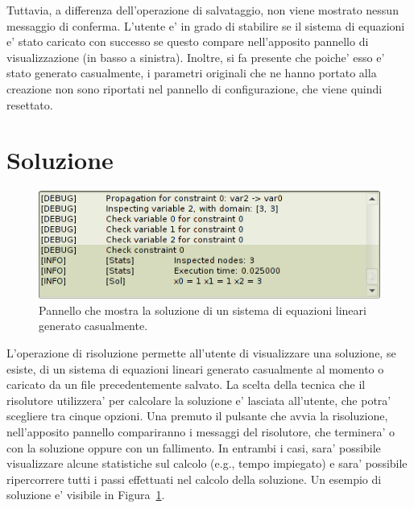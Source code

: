 \documentclass{article}
\begin{document}
Tuttavia, a differenza dell'operazione di salvataggio, non viene mostrato nessun messaggio di conferma. L'utente e' in grado di stabilire se il sistema di equazioni e' stato caricato con successo se questo compare nell'apposito pannello di visualizzazione (in basso a sinistra). Inoltre, si fa presente che poiche' esso e' stato generato casualmente, i parametri originali che ne hanno portato alla creazione non sono riportati nel pannello di configurazione, che viene quindi resettato.

\section{Soluzione}
\label{sec:soluzione}

\begin{figure}[htp!]
	\centering
	\includegraphics[scale=.5]{ug-images/solution.png}
	\caption{Pannello che mostra la soluzione di un sistema di equazioni lineari generato casualmente.}
	\label{fig:soluzione}
\end{figure}

L'operazione di risoluzione permette all'utente di visualizzare una soluzione, se esiste, di un sistema di equazioni lineari generato casualmente al momento o caricato da un file precedentemente salvato. La scelta della tecnica che il risolutore utilizzera' per calcolare la soluzione e' lasciata all'utente, che potra' scegliere tra cinque opzioni. Una premuto il pulsante che avvia la risoluzione, nell'apposito pannello compariranno i messaggi del risolutore, che terminera' o con la soluzione oppure con un fallimento. In entrambi i casi, sara' possibile visualizzare alcune statistiche sul calcolo (e.g., tempo impiegato) e sara' possibile ripercorrere tutti i passi effettuati nel calcolo della soluzione. Un esempio di soluzione e' visibile in Figura~\ref{fig:soluzione}.

\end{document}

